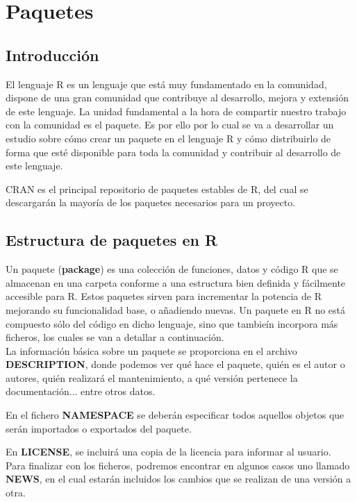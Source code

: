\section{Paquetes}
\subsection{Introducci\'on}


El lenguaje R es un lenguaje que est\'a muy fundamentado en la comunidad, dispone de una gran comunidad que 
contribuye al desarrollo, mejora y extensi\'on de este lenguaje. La unidad fundamental a la hora de compartir 
nuestro trabajo con la comunidad es el paquete. Es por ello por lo cual se va a desarrollar un estudio sobre 
c\'omo crear un paquete en el lenguaje R y c\'omo distribuirlo de forma que est\'e disponible para toda la 
comunidad y contribuir al desarrollo de este lenguaje.

CRAN es el principal repositorio de paquetes estables de R, del cual se descargar\'an la mayor\'ia de los paquetes necesarios para un proyecto.


\subsection{Estructura de paquetes en R}

Un paquete (\textbf{package}) es una colecci\'on de funciones, datos y c\'odigo R que se almacenan en una carpeta 
conforme a una estructura bien definida y f\'acilmente accesible para R.
Estos paquetes sirven para incrementar la potencia de R mejorando su funcionalidad base, o a\~nadiendo 
nuevas.
Un paquete en R no est\'a compuesto s\'olo del c\'odigo en dicho lenguaje, sino que tambie\'in incorpora m\'as ficheros, 
los cuales se van a detallar a continuaci\'on.\\

La informaci\'on b\'asica sobre un paquete se proporciona en el archivo \textbf{DESCRIPTION}, donde podemos ver qu\'e hace 
el paquete, qui\'en es el autor o autores, qui\'en realizar\'a el mantenimiento, a qu\'e versi\'on pertenece la documentaci\'on... entre otros datos.

En el fichero \textbf{NAMESPACE} se deber\'an especificar todos aquellos objetos que ser\'an importados o exportados del paquete.

En \textbf{LICENSE}, se incluir\'a una copia de la licencia para informar al usuario.\\

Para finalizar con los ficheros, podremos encontrar en algunos casos uno llamado \textbf{NEWS}, en el cual estar\'an 
incluidos los cambios que se realizan de una versi\'on a otra.
\\

